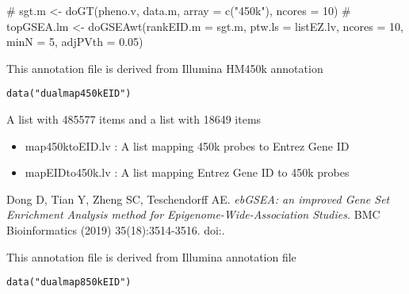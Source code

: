 \documentclass[letterpaper]{book}
\begin{document}
%
\begin{Examples}
\begin{ExampleCode}
# sgt.m <- doGT(pheno.v, data.m, array = c("450k"), ncores = 10)
# topGSEA.lm <- doGSEAwt(rankEID.m = sgt.m, ptw.ls = listEZ.lv, ncores = 10, minN = 5, adjPVth = 0.05)


\end{ExampleCode}
\end{Examples}
%
\begin{Description}\relax
This annotation file is derived from Illumina HM450k annotation
\end{Description}
%
\begin{Usage}
\begin{verbatim}
data("dualmap450kEID")
\end{verbatim}
\end{Usage}
%
\begin{Format}
A list with 485577 items and a list with 18649 items
\end{Format}
%
\begin{Details}\relax
\begin{itemize}

\item{} map450ktoEID.lv : A list mapping 450k probes to Entrez Gene ID
\item{} mapEIDto450k.lv : A list mapping Entrez Gene ID to 450k probes

\end{itemize}

\end{Details}
%
\begin{References}\relax
Dong D, Tian Y, Zheng SC, Teschendorff AE.
\emph{ebGSEA: an improved Gene Set Enrichment Analysis method for Epigenome-Wide-Association Studies.}
BMC Bioinformatics (2019) 35(18):3514-3516.
doi:.
\end{References}
%
\begin{Description}\relax
This annotation file is derived from Illumina annotation file
\end{Description}
%
\begin{Usage}
\begin{verbatim}
data("dualmap850kEID")
\end{verbatim}
\end{Usage}
\end{document}
